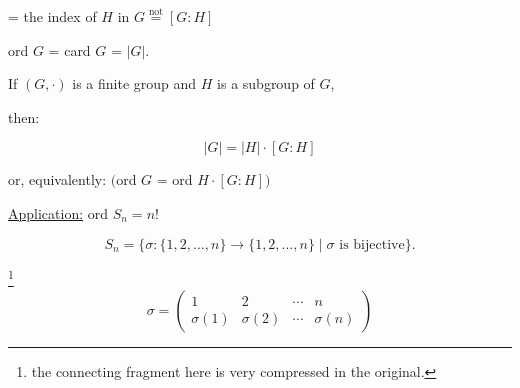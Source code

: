 \documentclass[12pt]{article}
\begin{document}
\noindent = the index of $H$ in $G \overset{\text{not}}{=} [G:H]$

\noindent ord $G$ = card $G$ = $|G|$.

\bigskip
\noindent{} \quad If $(G,\cdot)$ is a finite group and $H$ is a subgroup of $G$,

\noindent then:

\[
\boxed{|G| = |H|\cdot [G:H]}
\]

\noindent or, equivalently: \quad $\big($ord $G$ = ord $H\cdot [G:H]\big)$

\bigskip
\noindent\underline{Application:} ord $S_n = n!$

\[
S_n = \{\sigma : \{1,2,\ldots,n\}\to\{1,2,\ldots,n\} \mid \sigma \text{ is bijective}\}.
\]

\noindent [Notation:]\footnote{the connecting fragment here is very compressed in the original.}
\[
\sigma = \begin{pmatrix} 1 & 2 & \cdots & n \\ \sigma(1) & \sigma(2) & \cdots & \sigma(n) \end{pmatrix}
\]
\end{document}
